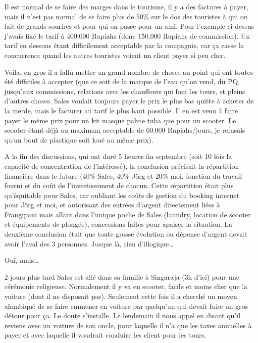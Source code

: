 Il est normal de se faire des marges dans le tourisme, il y a des factures à payer, mais il n’est pas normal de se faire plus de 50\% sur le dos des touristes à qui on fait de grands sourires et pour qui on passe pour un ami. Pour l’exemple ci dessus j’avais fixé le tarif à 400.000 Rupiahs (donc 150.000 Rupiahs de commission). Un tarif en dessous étant difficilement acceptable par la compagnie, car ça casse la concurrence quand les autres touristes voient un client payer si peu cher.

Voila, en gros il a fallu mettre un grand nombre de choses au point qui ont toutes été difficiles à accepter (que ce soit de la marque de l’eau qu’on vend, du PQ, jusqu’aux commissions, relations avec les chauffeurs qui font les tours, et pleins d’autres choses. Sales voulait toujours payer le prix le plus bas quitte à acheter de la merde, mais le facturer au tarif le plus haut possible. Il en est venu à faire payer le même prix pour un kit masque palme tuba que pour un scooter. Le scooter étant déjà au maximum acceptable de 60.000 Rupiahs/jours, je refusais qu’un bout de plastique soit loué au même prix).

A la fin des discussions, qui ont duré 5 heures fin septembre (soit 10 fois la capacité de concentration de l’intéressé), la conclusion précisait la répartition financière dans le future (40\% Sales, 40\% Jörg et 20\% moi, fonction du travail fourni et du coût de l’investissement de chacun. Cette répartition était plus qu’équitable pour Sales, car oubliant les coûts de gestion du booking internet pour Jörg et moi, et autorisant des entrées d’argent directement liées à Frangipani mais allant dans l’unique poche de Sales (laundry, location de scooter et équipements de plongée), concessions faites pour apaiser la situation. La deuxième conclusion était que toute grosse évolution ou dépense d’argent devait avoir l’aval des 3 personnes. Jusque là, rien d’illogique…

Oui, mais…

2 jours plus tard Sales est allé dans sa famille à Singaraja (3h d’ici) pour une cérémonie religieuse. Normalement il y va en scooter, facile et moins cher que la voiture (dont il ne disposait pas). Seulement cette fois il a cherché un moyen alambiqué de se faire emmener en voiture par quelqu’un qui devait faire un gros détour pour ça. Le doute s’installe. Le lendemain il nous appel en disant qu’il reviens avec un voiture de son oncle, pour laquelle il n’a que les taxes annuelles à payer et avec laquelle il voudrait conduire les client pour les tours.

